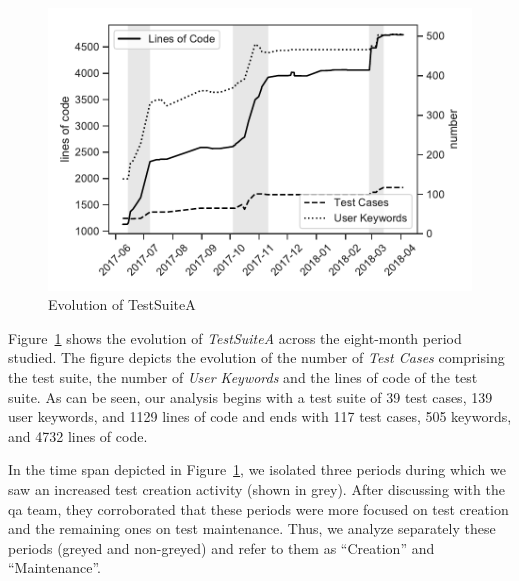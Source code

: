 \begin{figure}[t!]
  \centering
  \includegraphics[width=0.7\columnwidth]{figures/evolution/project_evolution.pdf}
  \caption{Evolution of TestSuiteA}
  \label{fig:project_evolution}%
\end{figure}

Figure~\ref{fig:project_evolution} shows the evolution of \emph{TestSuiteA} across the eight-month period studied. The figure depicts the evolution of the number of \emph{Test Cases} comprising the test suite, the number of \emph{User Keywords} and the lines of code of the test suite. As can be seen, our analysis begins with a test suite of 39 test cases, 139 user keywords, and 1129 lines of code and ends with 117 test cases, 505 keywords, and 4732 lines of code.

In the time span depicted in Figure~\ref{fig:project_evolution}, we isolated three periods during which we saw an increased test creation activity (shown in grey). After discussing with the \gls{qa} team, they corroborated that these periods were more focused on test creation and the remaining ones on test maintenance. Thus, we analyze separately these periods (greyed and non-greyed) and refer to them as ``Creation'' and ``Maintenance''.